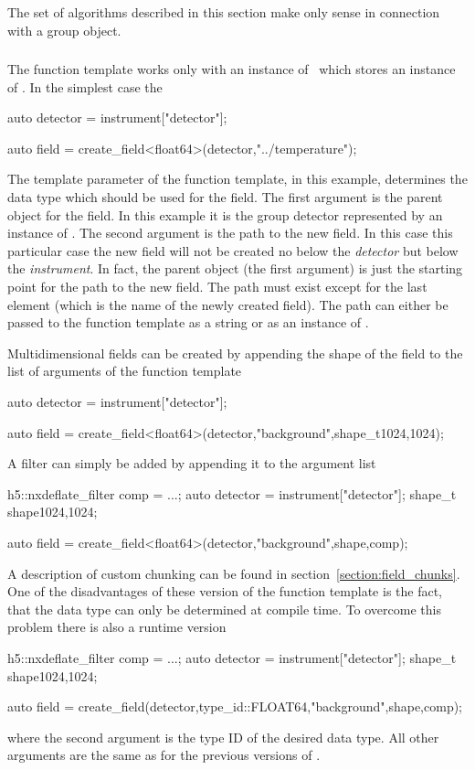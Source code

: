 
The set of algorithms described in this section make only sense in connection 
with a group object.

\subsubsection{}

The  function template works only with an instance of
\nxobject\ which stores an instance of \nxgroup. 
In the simplest case the  
\begin{cppcode}
auto detector = instrument["detector"];

auto field = create_field<float64>(detector,"../temperature");
\end{cppcode}
The template parameter of the  function template, in this
example, determines the data type which should be used for the field. 
The first argument is the parent object for the field. In this example it is the 
group detector represented by an instance of \nxobject. The second argument is
the path to the new field. In this case this particular case the new field will
not be created no below the \emph{detector} but below the \emph{instrument}. In
fact, the parent object (the first argument) is just the starting point for the
path to the new field. The path must exist except for the last element (which is
the name of the newly created field). 
The path can either be passed to the function template as a string or as an
instance of \nxpath. 

Multidimensional fields can be created by appending the shape of the field 
to the list of arguments of the  function template
\begin{cppcode}
auto detector = instrument["detector"];

auto field = create_field<float64>(detector,"background",shape_t{1024,1024});
\end{cppcode}
A filter can simply be added by appending it to the argument list
\begin{cppcode}
h5::nxdeflate_filter comp = ...;
auto detector = instrument["detector"];
shape_t shape{1024,1024};

auto field = create_field<float64>(detector,"background",shape,comp);
\end{cppcode}
A description of custom chunking can be found in
section~\ref{section:field_chunks}.
One of the disadvantages of these version of the  function
template is the fact, that the data type can only be determined at compile time. 
To overcome this problem there is also a runtime version 
\begin{cppcode}
h5::nxdeflate_filter comp = ...;
auto detector = instrument["detector"];
shape_t shape{1024,1024};

auto field = create_field(detector,type_id::FLOAT64,"background",shape,comp);
\end{cppcode}
where the second argument is the type ID of the desired data type. All other
arguments are the same as for the previous versions of .

